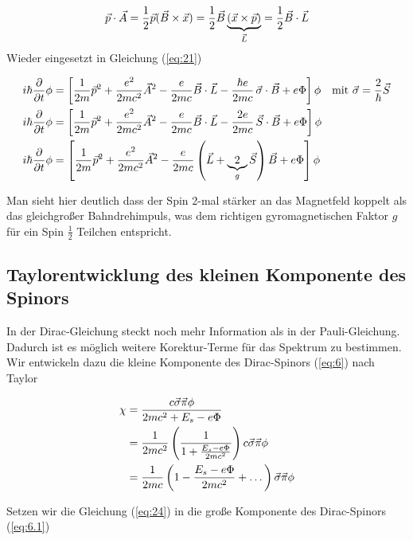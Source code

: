 \begin{align}
  \label{eq:22}
  \vec p\cdot\vec A = \frac{1}{2}\vec p(\vec B\times\vec x) = \frac{1}{2}\vec B\underbr{ (\vec x\times\vec p)}_{\vec L} = \frac{1}{2}\vec B\cdot\vec L
\end{align}
Wieder eingesetzt in Gleichung (\ref{eq:21})

\begin{align}
  \label{eq:23}
   i\hbar\pdiff_t\phi &=  \left[\frac{1}{2m}\vec p^2 + \frac{e^2}{2mc^2}\vec A^2-\frac{e}{2mc}\vec B\cdot\vec L   -  \frac{\hbar e}{2mc}\, \vec \sigma\cdot\vec B   + e\Phi\right] \phi \quad \text{mit }\vec \sigma = \frac{2}{\hbar}\vec S \notag\\
   i\hbar\pdiff_t\phi &=  \left[\frac{1}{2m}\vec p^2 + \frac{e^2}{2mc^2}\vec A^2-\frac{e}{2mc}\vec B\cdot\vec L   -  \frac{2e}{2mc}\, \vec S \cdot\vec B   + e\Phi\right] \phi \notag\\
   i\hbar\pdiff_t\phi &=  \left[\frac{1}{2m}\vec p^2 + \frac{e^2}{2mc^2}\vec A^2- \frac{e}{2mc}\left(\vec L   +  \underbr{2}_{g} \vec S \right)\vec B   + e\Phi\right] \phi
\end{align}

Man sieht hier deutlich dass der Spin 2-mal stärker an das Magnetfeld koppelt als das gleichgroßer Bahndrehimpuls, was dem richtigen gyromagnetischen Faktor \(g\) für ein Spin \(\frac{1}{2}\) Teilchen entspricht.


\subsection*{Taylorentwicklung des kleinen Komponente des Spinors}

In der Dirac-Gleichung steckt noch mehr Information als in der Pauli-Gleichung. Dadurch ist es möglich weitere Korektur-Terme für das Spektrum zu bestimmen. Wir entwickeln dazu die kleine Komponente des Dirac-Spinors (\ref{eq:6}) nach Taylor

\begin{align}
  \label{eq:24}
  \chi&= \frac{c\vec\sigma\vec\pi\phi}{2mc^2+E_s-e\Phi} \notag\\
&= \frac{1}{2mc^2}\left( \frac{1}{1+ \frac{E_s-e\Phi}{2mc^2}}\right)c\vec\sigma\vec\pi\phi \notag\\
&= \frac{1}{2mc}\left(1 - \frac{E_s-e\Phi}{2mc^2} + \dots\right)\vec\sigma\vec\pi\phi
\end{align}

Setzen wir die Gleichung (\ref{eq:24}) in die große Komponente des Dirac-Spinors (\ref{eq:6.1})


